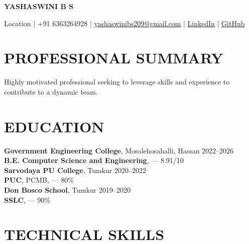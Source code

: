 \documentclass[9pt,a4paper]{extarticle}
\begin{document}

\begin{center}

{\Large \textbf{YASHASWINI B S}}

\vspace{1pt}

Location |
+91 6363264928 |
\href{mailto:yashaswinibs209@gmail.com}{yashaswinibs209@gmail.com} |
\href{https://linkedin.com/in/yashaswini-b-s-b995a7330}{LinkedIn} |
\href{https://github.com/yashaswini-s-naik}{GitHub}

\end{center}


\section*{PROFESSIONAL SUMMARY}

Highly motivated professional seeking to leverage skills and experience to contribute to a dynamic team.


\section*{EDUCATION}

\noindent \textbf{Government Engineering College}, Mosalehosahalli, Hassan \hfill 2022–2026\vspace{1pt}\\
\noindent \textbf{B.E. Computer Science and Engineering}, — \hfill 8.91/10\vspace{1pt}\\
\noindent \textbf{Sarvodaya PU College}, Tumkur \hfill 2020–2022\vspace{1pt}\\
\noindent \textbf{PUC}, PCMB, — \hfill 80\%\vspace{1pt}\\
\noindent \textbf{Don Bosco School}, Tumkur \hfill 2019–2020\vspace{1pt}\\
\noindent \textbf{SSLC}, — \hfill 90\%\vspace{1pt}\\



\section*{TECHNICAL SKILLS}
\end{document}
